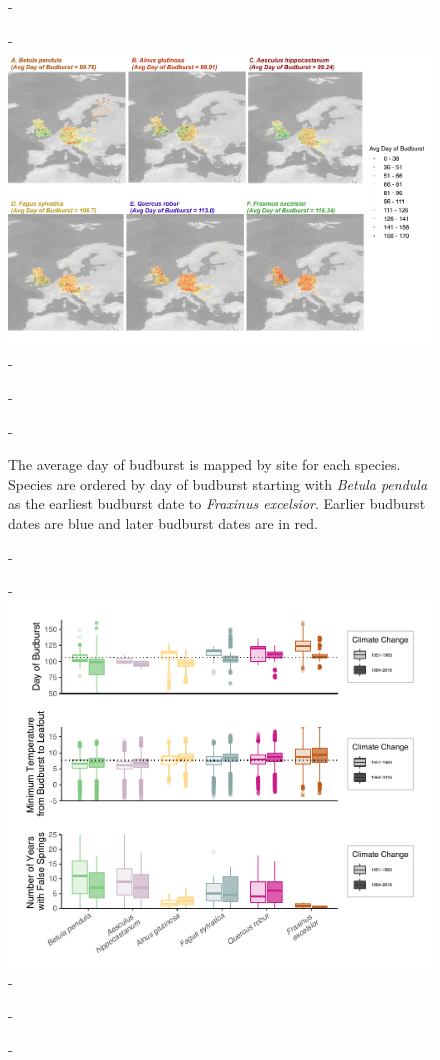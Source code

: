\documentclass{article}\usepackage[]{graphicx}\usepackage[]{color}
\begin{document}
{\begin{figure} [H]
  -\begin{center}
  -\includegraphics[width=14cm]{..//figures/BB_gis.pdf}
  -\caption{The average day of budburst is mapped by site for each species. Species are ordered by day of budburst starting with \textit{Betula pendula} as the earliest budburst date to \textit{Fraxinus excelsior}. Earlier budburst dates are blue and later budburst dates are in red. }\label{fig:bbmap}
  -\end{center}
  -\end{figure}}
  
{\begin{figure} [H]
  -\begin{center}
  -\includegraphics[width=12cm]{..//figures/Boxplot_BBTminFS.pdf}
  -\caption{}\label{fig:boxfs}
  -\end{center}
  -\end{figure}}
  
\end{document}
